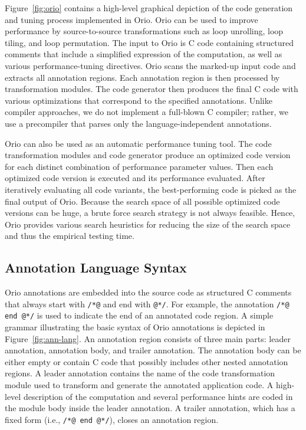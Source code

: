 Figure~\ref{fig:orio} contains a high-level graphical depiction of the code
generation and tuning process implemented in Orio.  Orio can be used to
improve performance by source-to-source transformations such as loop
unrolling, loop tiling, and loop permutation. The input to Orio is C code
containing structured comments that include a simplified expression of the
computation, as well as various performance-tuning directives. Orio scans the
marked-up input code and extracts all annotation regions. Each annotation
region is then processed by transformation modules. The code generator then
produces the final C code with various optimizations that correspond to the
specified annotations. Unlike compiler approaches, we do not implement a
full-blown C compiler; rather, we use a precompiler that parses only the
language-independent annotations.

Orio can also be used as an automatic performance tuning tool.  The code
transformation modules and code generator produce an optimized code version
for each distinct combination of performance parameter values. Then each
optimized code version is executed and its performance evaluated.  After
iteratively evaluating all code variants, the best-performing code is picked
as the final output of Orio. Because the search space of all possible
optimized code versions can be huge, a brute force search strategy is not
always feasible. Hence, Orio provides various search heuristics for reducing
the size of the search space and thus the empirical testing time.


\subsection{Annotation Language Syntax} 
\label{sec:ann-lang}

Orio annotations are embedded into the source code as structured C comments
that always start with \texttt{/*@} and end with \texttt{@*/}. For example,
the annotation \texttt{/*@ end @*/} is used to indicate the end of an
annotated code region. A simple grammar illustrating the basic syntax of Orio
annotations is depicted in Figure~\ref{fig:ann-lang}. An annotation region
consists of three main parts: leader annotation, annotation body, and trailer
annotation. The annotation body can be either empty or contain C code that
possibly includes other nested annotation regions. A leader annotation
contains the name of the code transformation module used to transform and
generate the annotated application code. A high-level description of the
computation and several performance hints are coded in the module body inside
the leader annotation. A trailer annotation, which has a fixed form (i.e.,
\texttt{/*@ end @*/}), closes an annotation region.

